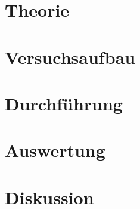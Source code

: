

  \section{Theorie}
  \section{Versuchsaufbau}
  \section{Durchführung}
  \section{Auswertung}
  \section{Diskussion}
  \printbibliography
  \nocite{*}

